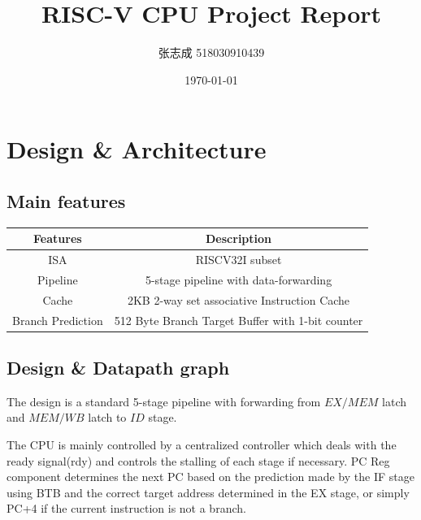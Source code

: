 \documentclass[UTF8, 12pt]{ctexart}
\title{RISC-V CPU Project Report}
\author{张志成 518030910439}
\date{\today}
\begin{document}
    \maketitle\medskip
    \section{Design \& Architecture}
        \subsection{Main features}
            \begin{center}
                \begin{tabular}{ |c|c| } 
                \hline
                    Features & Description \\
                \hline
                    ISA & RISCV32I subset \\
                \hline
                    Pipeline & 5-stage pipeline with data-forwarding \\
                \hline
                    Cache & 2KB 2-way set associative Instruction Cache \\
                \hline
                    Branch Prediction & 512 Byte Branch Target Buffer with 1-bit counter\\
                \hline
                \end{tabular}
            \end{center}
        \subsection{Design \& Datapath graph}
            The design is a standard 5-stage pipeline with forwarding from $EX/MEM$ latch and $MEM/WB$ latch to $ID$ stage.

            The CPU is mainly controlled by a centralized controller which deals with the ready signal(rdy) and controls the stalling of each stage if necessary.
            PC Reg component determines the next PC based on the prediction made by the IF stage using BTB and the correct target address determined in the EX stage, or simply PC+4 if the current instruction is not a branch. 
\end{document}
